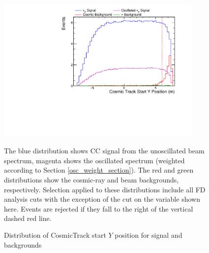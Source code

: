 \begin{figure}
\begin{center}
\includegraphics[width=0.9\textwidth]{figures/selection/n1_cosStartY.pdf}
\end{center}
\caption{Distribution of CosmicTrack start $Y$ position for signal and backgrounds}{
The blue distribution shows \numu CC signal from the unoscillated beam spectrum,
magenta shows the oscillated spectrum (weighted according to Section
\ref{osc_weight_section}).
The red and green distributions show the cosmic-ray and beam backgrounds,
respectively.
Selection applied to these distributions include all FD analysis cuts
with the exception of the cut on the variable shown here.
Events are rejected if they fall to the right of the vertical
dashed red line.
}
\label{cosStartY}
\end{figure}

